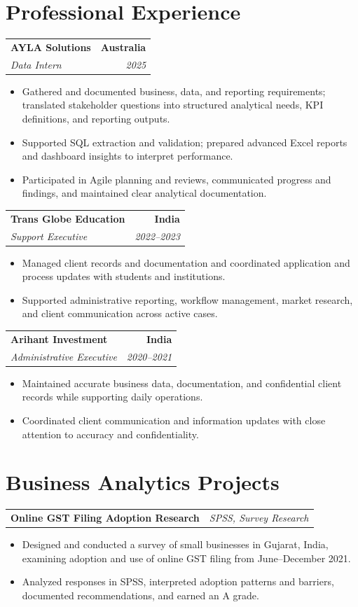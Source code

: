 \documentclass[letterpaper,10pt]{article}
\makeatletter
\newcommand{\role}[4]{%
  \begin{tabularx}{\textwidth}{@{}Xr@{}}
    \textbf{#1} & \textbf{#2} \\
    \textit{#3} & \textit{#4}
  \end{tabularx}\vspace{-1pt}
}
\newcommand{\project}[2]{%
  \begin{tabularx}{\textwidth}{@{}Xr@{}}
    \textbf{#1} & \textit{#2}
  \end{tabularx}\vspace{-1pt}
}
\makeatother
\begin{document}
\section{Professional Experience}
\role{AYLA Solutions}{Australia}{Data Intern}{2025}
\begin{itemize}
  \item Gathered and documented business, data, and reporting requirements; translated stakeholder questions into structured analytical needs, KPI definitions, and reporting outputs.
  \item Supported SQL extraction and validation; prepared advanced Excel reports and dashboard insights to interpret performance.
  \item Participated in Agile planning and reviews, communicated progress and findings, and maintained clear analytical documentation.
\end{itemize}
\vspace{1pt}

\role{Trans Globe Education}{India}{Support Executive}{2022--2023}
\begin{itemize}
  \item Managed client records and documentation and coordinated application and process updates with students and institutions.
  \item Supported administrative reporting, workflow management, market research, and client communication across active cases.
\end{itemize}
\vspace{1pt}

\role{Arihant Investment}{India}{Administrative Executive}{2020--2021}
\begin{itemize}
  \item Maintained accurate business data, documentation, and confidential client records while supporting daily operations.
  \item Coordinated client communication and information updates with close attention to accuracy and confidentiality.
\end{itemize}

\section{Business Analytics Projects}
\project{Online GST Filing Adoption Research}{SPSS, Survey Research}
\begin{itemize}
  \item Designed and conducted a survey of small businesses in Gujarat, India, examining adoption and use of online GST filing from June--December 2021.
  \item Analyzed responses in SPSS, interpreted adoption patterns and barriers, documented recommendations, and earned an A grade.
\end{itemize}
\vspace{1pt}
\end{document}
